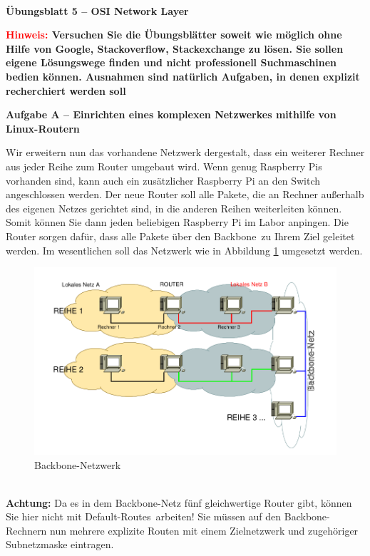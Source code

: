 \documentclass[paper=a4,fontsize=11pt]{scrartcl}%
\numberwithin{equation}{section}
\begin{document}
\begin{center}
~\\
\Large{\textbf{Übungsblatt 5 -- OSI Network Layer}}
\end{center}
\large{\textbf{\textcolor{red}{Hinweis:} Versuchen Sie die Übungsblätter soweit wie möglich ohne Hilfe von Google, Stackoverflow, Stackexchange zu lösen. Sie sollen eigene Lösungswege finden und nicht professionell Suchmaschinen bedien können. Ausnahmen sind natürlich Aufgaben, in denen explizit recherchiert werden soll}

\begin{center}\Large{\textbf{Aufgabe A -- Einrichten eines komplexen Netzwerkes mithilfe von Linux-Routern}}\end{center}\vskip0.25in
Wir erweitern nun das vorhandene Netzwerk dergestalt, dass ein weiterer Rechner aus
jeder Reihe zum Router umgebaut wird. Wenn genug Raspberry Pis vorhanden sind, kann auch ein zusätzlicher Raspberry Pi an den Switch angeschlossen werden. Der neue Router soll alle Pakete, die an Rechner außerhalb des eigenen Netzes gerichtet sind, in die anderen Reihen weiterleiten können. Somit können Sie dann jeden beliebigen Raspberry Pi im Labor \glqq anpingen\grqq. Die Router sorgen dafür, dass alle Pakete über den \glqq Backbone\grqq\ zu Ihrem Ziel geleitet werden. Im wesentlichen soll das Netzwerk wie in Abbildung \ref{backbone} umgesetzt werden. 
\begin{figure}[H]
	\center
	\includegraphics[scale=0.4]{backbone}
	\caption{Backbone-Netzwerk}
	\label{backbone}
\end{figure}
\vskip0.05in ~\\
\textbf{Achtung:} Da es in dem Backbone-Netz fünf gleichwertige Router gibt, können Sie hier nicht mit \glqq Default-Routes\grqq\ arbeiten! Sie müssen auf den Backbone-Rechnern nun mehrere explizite Routen mit einem Zielnetzwerk und zugehöriger Subnetzmaske eintragen.
}
\end{document}
